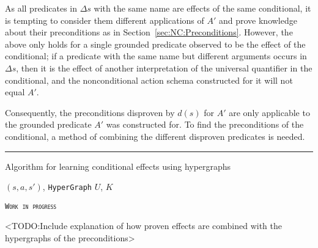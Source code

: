 \documentclass[../Master.tex]{subfiles}
\begin{document}
As all predicates in $\Delta s$ with the same name are effects of the same conditional, it is tempting to consider them different applications of $A'$ and prove knowledge about their preconditions as in Section~\ref{sec:NC:Preconditions}. However, the above only holds for a single grounded predicate observed to be the effect of the conditional; if a predicate with the same name but different arguments occurs in $\Delta s$, then it is the effect of another interpretation of the universal quantifier in the conditional, and the nonconditional action schema constructed for it will not equal $A'$.

Consequently, the preconditions disproven by $d(s)$ for $A'$ are only applicable to the grounded predicate $A'$ was constructed for. To find the preconditions of the conditional, a method of combining the different disproven predicates is needed.

\noindent\rule{\textwidth}{1pt}


\begin{algorithm}
    \caption{Algorithm for learning conditional effects using hypergraphs}\label{algo:CondEffLearn}
    \begin{algorithmic}
         {$\left( s, a, s'\right)$, \texttt{HyperGraph} $U$, $K$}
                    
            \EndFor
        \EndFunction%
    \end{algorithmic}
\end{algorithm}

\textsc{\texttt{Work in progress}}

<TODO:\@ Include explanation of how proven effects are combined with the hypergraphs of the preconditions>
\end{document}
